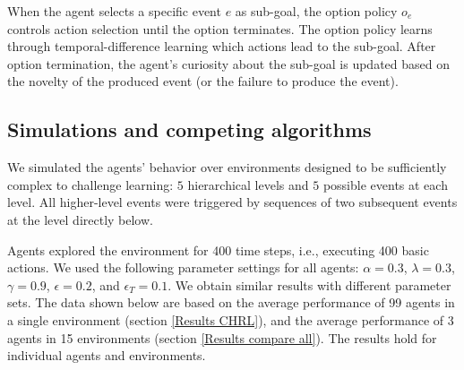 \documentclass{article}
\begin{document}
When the agent selects a specific event $e$ as sub-goal, the option policy $o_e$ controls action selection until the option terminates. The option policy learns through temporal-difference learning \cite{sutton_reinforcement_2017} which actions lead to the sub-goal. After option termination, the agent's curiosity about the sub-goal is updated based on the novelty of the produced event (or the failure to produce the event).


\subsection{Simulations and competing algorithms} \label{Comparison agents}

We simulated the agents' behavior over environments designed to be sufficiently complex to challenge learning: $5$ hierarchical levels and $5$ possible events at each level. All higher-level events were triggered by sequences of two subsequent events at the level directly below.%

Agents explored the environment for 400 time steps, i.e., executing 400 basic actions. We used the following parameter settings for all agents: $\alpha = 0.3$, $\lambda = 0.3$, $\gamma = 0.9$, $\epsilon = 0.2$, and $\epsilon_T = 0.1$. We obtain similar results with different parameter sets. The data shown below are based on the average performance of 99 agents in a single environment (section \ref{Results CHRL}), and the average performance of 3 agents in 15 environments (section \ref{Results compare all}). The results hold for individual agents and environments.
\end{document}
